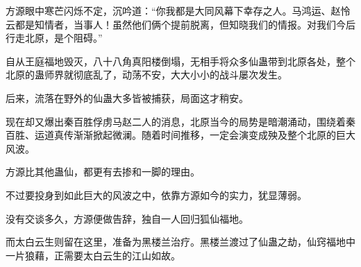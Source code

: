 \begin{this_body}
方源眼中寒芒闪烁不定，沉吟道：“你我都是大同风幕下幸存之人。马鸿运、赵怜云都是知情者，当事人！虽然他们俩个提前脱离，但知晓我们的情报。对我们今后行走北原，是个阻碍。”

自从王庭福地毁灭，八十八角真阳楼倒塌，无相手将众多仙蛊带到北原各处，整个北原的蛊师界就彻底乱了，动荡不安，大大小小的战斗屡次发生。

后来，流落在野外的仙蛊大多皆被捕获，局面这才稍安。

现在却又爆出秦百胜俘虏马赵二人的消息，北原当今的局势是暗潮涌动，围绕着秦百胜、运道真传渐渐掀起微澜。随着时间推移，一定会演变成殃及整个北原的巨大风波。

方源比其他蛊仙，都更有去掺和一脚的理由。

不过要投身到如此巨大的风波之中，依靠方源如今的实力，犹显薄弱。

没有交谈多久，方源便做告辞，独自一人回归狐仙福地。

而太白云生则留在这里，准备为黑楼兰治疗。黑楼兰渡过了仙蛊之劫，仙窍福地中一片狼藉，正需要太白云生的江山如故。

\end{this_body}

